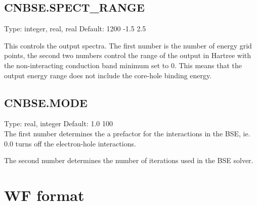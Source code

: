\documentclass[12pt]{revtex4}
\begin{document}
\subsection{CNBSE.SPECT\_RANGE}
Type: integer, real, real
Default: 1200 -1.5 2.5

This controls the output spectra. The first number is the number of energy grid points, the second two
numbers control the range of the output in Hartree with the non-interacting conduction band minimum
set to 0. This means that the output energy range does not include the core-hole binding energy.


\subsection{CNBSE.MODE}
Type: real, integer
Default: 1.0 100 \\

The first number determines the a prefactor for the interactions in the BSE, ie. 0.0 turns off the 
electron-hole interactions. 

The second number determines the number of iterations used in the BSE solver.

\appendix
\section{WF format}\label{WF_format}
\end{document}
